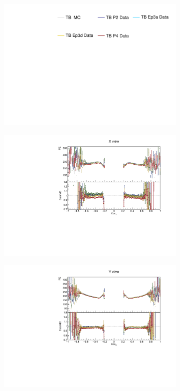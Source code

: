 \begin{figure}[!ht]
  \begin{subfigure}{\textwidth}
    \centering
    \includegraphics[height=0.2\linewidth]{essentialsec_tb/legend.pdf}
  \end{subfigure}
  \vspace*{2mm}
  
  \begin{subfigure}{0.5\textwidth}
    \includegraphics[width=\linewidth]{PlotsAngularDistribution/pe_cosz_x.pdf}
  \end{subfigure}
  \begin{subfigure}{0.5\textwidth}
    \includegraphics[width=\linewidth]{PlotsAngularDistribution/pe_cosz_y.pdf}

\end{subfigure}
\end{figure}
